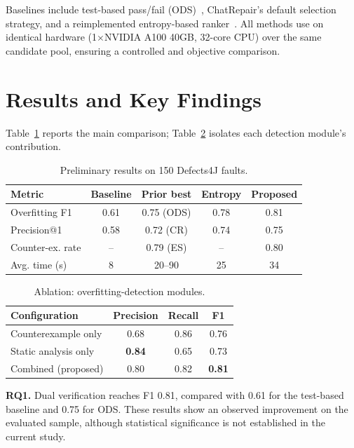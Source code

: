 \documentclass[conference]{IEEEtran}
\begin{document}
Baselines include test-based pass/fail (ODS)~\cite{fraser2011evosuite}, ChatRepair's default selection strategy, and a reimplemented entropy-based ranker~\cite{wang2024entropy}. All methods use on identical hardware (1$\times$NVIDIA A100 40GB, 32-core CPU) over the same candidate pool, ensuring a controlled and objective comparison.

\section{Results and Key Findings}
Table~\ref{tab:results} reports the main comparison; Table~\ref{tab:ablation} isolates each detection module's contribution.

\begin{table}[!t]
\centering
\caption{Preliminary results on 150 Defects4J faults.}
\label{tab:results}
\small
\begin{tabular}{lcccc}
\toprule
Metric & Baseline & Prior best & Entropy & Proposed \\
\midrule
Overfitting F1 & 0.61 & 0.75 (ODS) & 0.78 & {0.81} \\
Precision@1 & 0.58 & 0.72 (CR) & 0.74 & {0.75} \\
Counter-ex. rate & -- & 0.79 (ES) & -- & {0.80} \\
Avg. time (s) & 8 & 20--90 & 25 & 34 \\
\bottomrule
\end{tabular}
\end{table}

\begin{table}[!t]
\centering
\caption{Ablation: overfitting-detection modules.}
\label{tab:ablation}
\small
\begin{tabular}{lccc}
\toprule
Configuration & Precision & Recall & F1 \\
\midrule
Counterexample only & 0.68 & 0.86 & 0.76 \\
Static analysis only & \textbf{0.84} & 0.65 & 0.73 \\
Combined (proposed) & 0.80 & 0.82 & \textbf{0.81} \\
\bottomrule
\end{tabular}
\end{table}

\textbf{RQ1.} Dual verification reaches F1 0.81, compared with 0.61 for the test-based baseline and 0.75 for ODS. These results show an observed improvement on the evaluated sample, although statistical significance is not established in the current study.
\end{document}
